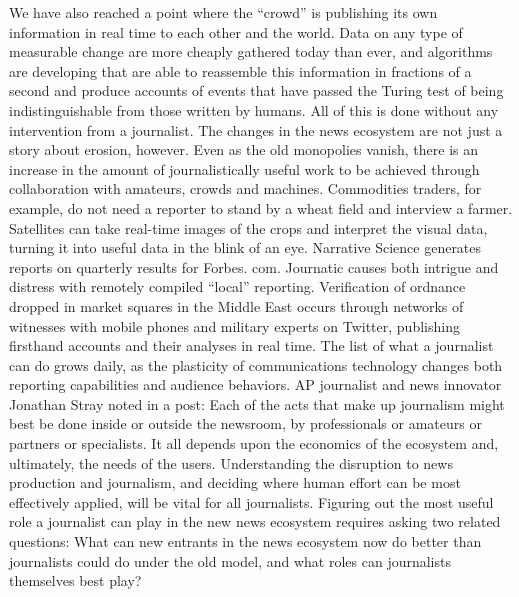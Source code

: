 We have also reached a point where the ``crowd'' is publishing its own information
in real time to each other and the world. Data on any type of measurable
change are more cheaply gathered today than ever, and algorithms are developing
that are able to reassemble this information in fractions of a second and
produce accounts of events that have passed the Turing test of being indistinguishable
from those written by humans. All of this is done without any intervention
from a journalist.
The changes in the news ecosystem are not just a story about erosion, however.
Even as the old monopolies vanish, there is an increase in the amount of journalistically
useful work to be achieved through collaboration with amateurs, crowds
and machines. Commodities traders, for example, do not need a reporter to stand
by a wheat field and interview a farmer. Satellites can take real-time images of
the crops and interpret the visual data, turning it into useful data in the blink
of an eye. Narrative Science generates reports on quarterly results for Forbes.
com. Journatic causes both intrigue and distress with remotely compiled ``local''
reporting. Verification of ordnance dropped in market squares in the Middle East
occurs through networks of witnesses with mobile phones and military experts
on Twitter, publishing firsthand accounts and their analyses in real time.
The list of what a journalist can do grows daily, as the plasticity of communications
technology changes both reporting capabilities and audience behaviors. AP
journalist and news innovator Jonathan Stray noted in a post:
Each of the acts that make up journalism might best be done inside
or outside the newsroom, by professionals or amateurs or partners or
specialists. It all depends upon the economics of the ecosystem and,
ultimately, the needs of the users.
Understanding the disruption to news production and journalism, and deciding
where human effort can be most effectively applied, will be vital for all journalists.
Figuring out the most useful role a journalist can play in the new news
ecosystem requires asking two related questions: What can new entrants in the
news ecosystem now do better than journalists could do under the old model,
and what roles can journalists themselves best play?

